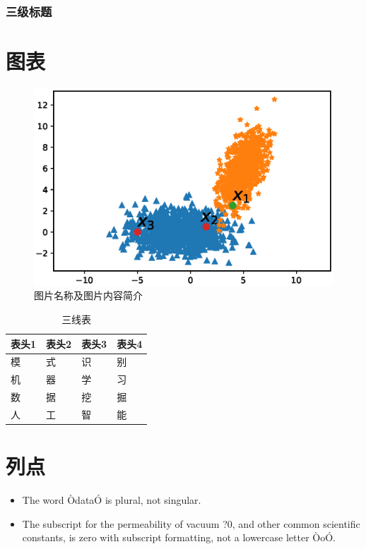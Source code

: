 \documentclass[letterpaper, 10pt, conference, twoside]{ieeeconf}
\begin{document}
\subsubsection{三级标题}

\section{图表}

\begin{figure}[htbp]
  \centering
  \includegraphics[width = 1\linewidth]{smooth}
  \caption{图片名称及图片内容简介}
  \label{fig:fig2}
\end{figure}


\begin{table}[htbp]
  \centering
 \caption{三线表}
 \label{tab:table2}
 \begin{tabular}{llll}
  \toprule
  表头1 & 表头2 & 表头3& 表头4\\
  \midrule
    模&式&识&别\\
    机&器&学&习\\
    数&据&挖&掘\\
    人&工&智&能\\
  \bottomrule
 \end{tabular}
\end{table}




\section{列点}

\begin{itemize}
\item The word ÒdataÓ is plural, not singular.
\item The subscript for the permeability of vacuum ?0, and other common scientific constants, is zero with subscript formatting, not a lowercase letter ÒoÓ.
\end{itemize}
\end{document}
